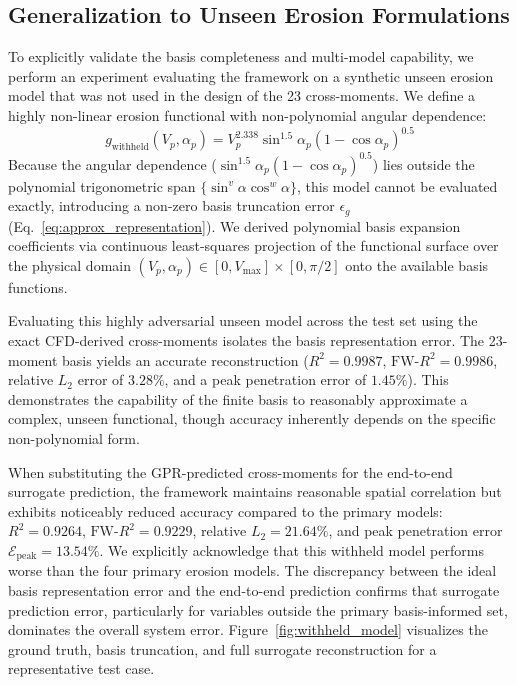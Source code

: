 \documentclass{article}
\begin{document}
\subsection{Generalization to Unseen Erosion Formulations}
To explicitly validate the basis completeness and multi-model capability, we perform an experiment evaluating the framework on a synthetic unseen erosion model that was not used in the design of the 23 cross-moments. We define a highly non-linear erosion functional with non-polynomial angular dependence:
\begin{equation}
    g_{\text{withheld}}(V_p, \alpha_p) = V_p^{2.338} \sin^{1.5}\alpha_p (1 - \cos\alpha_p)^{0.5}
\end{equation}
Because the angular dependence ($\sin^{1.5}\alpha_p (1 - \cos\alpha_p)^{0.5}$) lies outside the polynomial trigonometric span $\{\sin^v\alpha \cos^w\alpha\}$, this model cannot be evaluated exactly, introducing a non-zero basis truncation error $\epsilon_g$ (Eq.~\ref{eq:approx_representation}). We derived polynomial basis expansion coefficients via continuous least-squares projection of the functional surface over the physical domain $(V_p, \alpha_p) \in [0, V_{\max}] \times [0, \pi/2]$ onto the available basis functions.

Evaluating this highly adversarial unseen model across the test set using the exact CFD-derived cross-moments isolates the basis representation error. The 23-moment basis yields an accurate reconstruction ($R^2 = 0.9987$, $\text{FW-}R^2 = 0.9986$, relative $L_2$ error of $3.28\%$, and a peak penetration error of $1.45\%$). This demonstrates the capability of the finite basis to reasonably approximate a complex, unseen functional, though accuracy inherently depends on the specific non-polynomial form.

When substituting the GPR-predicted cross-moments for the end-to-end surrogate prediction, the framework maintains reasonable spatial correlation but exhibits noticeably reduced accuracy compared to the primary models: $R^2 = 0.9264$, $\text{FW-}R^2 = 0.9229$, relative $L_2 = 21.64\%$, and peak penetration error $\mathcal{E}_{\text{peak}} = 13.54\%$. We explicitly acknowledge that this withheld model performs worse than the four primary erosion models. The discrepancy between the ideal basis representation error and the end-to-end prediction confirms that surrogate prediction error, particularly for variables outside the primary basis-informed set, dominates the overall system error. Figure~\ref{fig:withheld_model} visualizes the ground truth, basis truncation, and full surrogate reconstruction for a representative test case.
\end{document}
